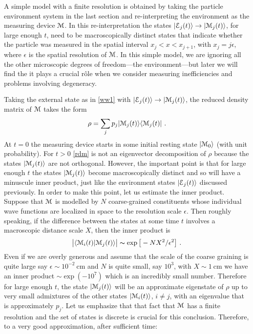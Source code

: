 \documentclass[12pt]{article}
\def\BM{{\EuScript M}}
\def\BE{{\EuScript E}}
\def\bra#1{\langle #1|}
\def\ket#1{| #1\rangle}
\def\braket#1#2{\VEV{#1 | #2}}
\def\VEV#1{\langle #1\rangle}
\newcommand{\EQ}[1]{\begin{equation}\begin{split} #1
\end{split}\end{equation}}
\begin{document}
A simple model with a finite resolution is obtained by taking the particle environment system in the last section and re-interpreting the environment as the measuring device $\BM$. In this re-interpretation the states $\ket{\BE_j(t)}\to\ket{\BM_j(t)}$, for large enough $t$, need to be macroscopically distinct states that indicate whether the particle was measured in the spatial interval $x_j<x<x_{j+1}$, with $x_j=j\epsilon$, where $\epsilon$ is the spatial resolution of $\BM$. In this simple model, we are ignoring all the other microscopic degrees of freedom---the environment---but later we will find the it plays a crucial r\^ole when we consider measuring inefficiencies and problems involving degeneracy.

Taking the external state as in \eqref{ww1} with $\ket{\BE_j(t)}\to\ket{\BM_j(t)}$, the reduced density matrix of $\BM$ takes the form
\EQ{
\rho=\sum_jp_j\ket{\BM_j(t)}\bra{\BM_j(t)}\ .
\label{rdm}
}
At $t=0$ the measuring device starts in some initial resting state $\ket{\BM_0}$ (with unit probability). For $t>0$ \eqref{rdm}
is not an eigenvector decomposition of $\rho$ because the states $\ket{\BM_j(t)}$ are not orthogonal. However, the important point is that for large enough $t$ the states $\ket{\BM_j(t)}$ become macroscopically distinct and so will have a minuscule inner product, just like the environment states $\ket{\BE_j(t)}$ discussed previously. 
In order to make this point, let us estimate the inner product. Suppose that $\BM$ is modelled by $N$ coarse-grained constituents
whose individual wave functions are localized in space to the resolution scale $\epsilon$. Then roughly speaking, if the difference between the states at some time $t$ involves a macroscopic distance scale $X$, then the inner product is 
\EQ{
\big|\braket{\BM_i(t)}{\BM_j(t)}\big|\thicksim \exp\big[-NX^2/\epsilon^2\big]\ .
\label{ipn}
}
Even if we are overly generous and assume that the scale of the coarse graining is quite large say $\epsilon\sim10^{-2}\ \text{cm}$ and $N$ is quite small, say $10^3$, with $X\sim 1\ \text{cm}$ we have an inner product $\sim\exp(-10^7)$ which is an incredibly small number.
Therefore for large enough $t$, the state $\ket{\BM_j(t)}$ will be an approximate eigenstate of $\rho$ up to very small admixtures of the other states $\ket{\BM_i(t)}$, $i\neq j$, with an eigenvalue that is approximately $p_j$. Let us emphasize that that fact that $\BM$ has a finite resolution and the set of states is discrete is crucial for this conclusion. Therefore, to a very good approximation, after sufficient time:
\end{document}
